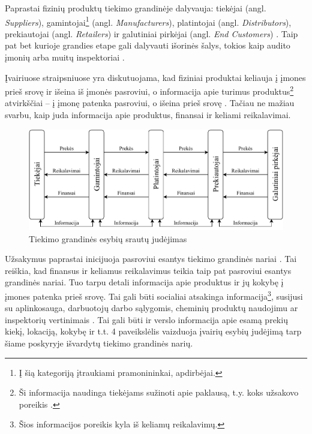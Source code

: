 Paprastai fizinių produktų tiekimo grandinėje dalyvauja: tiekėjai (angl. \textit{Suppliers}), gamintojai\footnote{Į šią kategoriją įtraukiami pramonininkai, apdirbėjai.} (angl. \textit{Manufacturers}), platintojai (angl. \textit{Distributors}), prekiautojai (angl. \textit{Retailers}) ir galutiniai pirkėjai (angl. \textit{End Customers}) \cite{kopczak2003supply}. Taip pat bet kurioje grandies etape gali dalyvauti išorinės šalys, tokios kaip audito įmonių arba muitų inspektoriai \cite{webber2009building}.

Įvairiuose straipsniuose yra diskutuojama, kad fiziniai produktai keliauja į įmones prieš srovę ir išeina iš įmonės pasroviui, o informacija apie turimus produktus\footnote{Ši informacija naudinga tiekėjams sužinoti apie paklausą, t.y. koks užsakovo poreikis \cite{croson2005upstream}.} atvirkščiai – į įmonę patenka pasroviui, o išeina prieš srovę \cite{prajogo2012supply, croson2005upstream}. Tačiau ne mažiau svarbu, kaip juda informacija apie produktus, finansai ir keliami reikalavimai.

\begin{figure}[H]
    \centering
    \includegraphics[scale=0.9]{images/supply-chain-entity-flow.pdf}
    \caption{Tiekimo grandinės esybių srautų judėjimas}
\end{figure}

Užsakymus paprastai inicijuoja pasroviui esantys tiekimo grandinės nariai \cite{croson2005upstream}. Tai reiškia, kad finansus ir keliamus reikalavimus teikia taip pat pasroviui esantys grandinės nariai. Tuo tarpu detali informacija apie produktus ir jų kokybę į įmones patenka prieš srovę. Tai gali būti socialiai atsakinga informacija\footnote{Šios informacijos poreikis kyla iš keliamų reikalavimų.}, susijusi su aplinkosauga, darbuotojų darbo sąlygomis, cheminių produktų naudojimu ar inspektorių vertinimais \cite{mani2015supply, vachon2006extending}. Tai gali būti ir verslo informacija apie esamą prekių kiekį, lokaciją, kokybę ir t.t. 4 paveikslėlis vaizduoja įvairių esybių judėjimą tarp šiame poskyryje išvardytų tiekimo grandinės narių.



